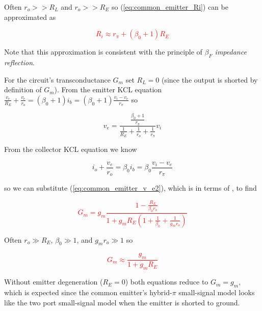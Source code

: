 \par
Often $r_{o} >> R_{L}$ and $r_{o} >> R_{E}$ so (\ref{eq:common_emitter_Ri}) can be approximated as

\textcolor{red}{
\begin{equation}
R_{i} \approx r_{\pi} + (\beta_{0}+1)R_{E}
\label{eq:common_emitter_Ri_approx}
\end{equation}
}

Note that this approximation is consistent with the principle of \textit{$\beta_{F}$ impedance reflection}.

For the circuit's transconductance $G_{m}$ set $R_{L} = 0$ (since the output is shorted by definition of $G_{m}$). From the emitter KCL equation $\frac{v_{e}}{R_{E}} + \frac{v_{e}}{r_{o}} = (\beta_{0} + 1)i_{b} = (\beta_{0} + 1)\frac{v_{i}-v_{e}}{r_{\pi}}$ so

\begin{equation}
v_{e} = \frac{\frac{\beta_{0}+1}{r_{\pi}}}{\frac{1}{R_{E}} + \frac{1}{r_{o}} + \frac{1}{r_{\pi}}}v_{i}
\label{eq:common_emitter_v_e2}
\end{equation}

From the collector KCL equation we know

\begin{equation}
i_{o} + \frac{v_{e}}{r_{o}} = \beta_{0}i_{b} = \beta_{0}\frac{v_{i}-v_{e}}{r_{\pi}}
\label{eq:common_emitter_KCL_collector2}
\end{equation}

so we can substitute (\ref{eq:common_emitter_v_e2}), which is in terms of \vin, to find \autocite[199]{analysis-design-analog-ics}

\textcolor{red}{
\begin{equation}
G_{m} = g_{m}\frac{1-\frac{R_{E}}{\beta_{0}r_{o}}}{1 + g_{m}R_{E}\left(1 + \frac{1}{\beta_{0}} + \frac{1}{g_{m}r_{o}}\right)}
\label{eq:common_emitter_Gm}
\end{equation}
}

Often $r_{o} \gg R_{E}$, $\beta_{0} \gg 1$, and $g_{m}r_{o} \gg 1$ so

\textcolor{red}{
\begin{equation}
G_{m} \approx \frac{g_{m}}{1 + g_{m}R_{E}}
\label{eq:common_emitter_Gm_approx}
\end{equation}
}

Without emitter degeneration ($R_{E} = 0$) both equations reduce to $G_{m} = g_{m}$, which is expected since the common emitter's hybrid-$\pi$ small-signal model looks like the two port small-signal model when the emitter is shorted to ground.

